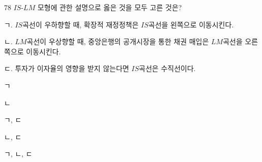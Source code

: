 \begin{question}{78}
$IS$-$LM$ 모형에 관한 설명으로 옳은 것을 모두 고른 것은?
\begin{framedtext}
ㄱ. $IS$곡선이 우하향할 때, 확장적 재정정책은 $IS$곡선을 왼쪽으로 이동시킨다. \par
ㄴ. $LM$곡선이 우상향할 때, 중앙은행의 공개시장을 통한 채권 매입은 $LM$곡선을 오른쪽으로 이동시킨다. \par
ㄷ. 투자가 이자율의 영향을 받지 않는다면 $IS$곡선은 수직선이다. \par
\end{framedtext}
\begin{choices}
  \item ㄱ
  \item ㄴ
  \item ㄱ, ㄷ
  \item ㄴ, ㄷ
  \item ㄱ, ㄴ, ㄷ
\end{choices}
\end{question}
